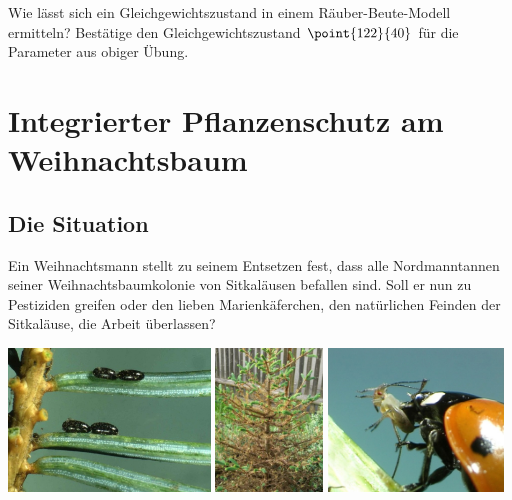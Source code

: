 \documentclass[%
11pt,%
twoside,%
titlepage,%
german,%
headsepline%
]{scrartcl}
\begin{document}
\begin{ueb}
Wie lässt sich ein Gleichgewichtszustand in einem Räuber-Beute-Modell ermitteln? Bestätige den Gleichgewichtszustand $\point{122}{40}$ für die Parameter aus obiger Übung.
\end{ueb}

\clearpage




\clearpage

\section{Integrierter Pflanzenschutz am Weihnachtsbaum}
\subsection{Die Situation}
Ein Weihnachtsmann stellt zu seinem Entsetzen fest, dass alle Nordmanntannen seiner Weihnachtsbaumkolonie von Sitkaläusen befallen sind. Soll er nun zu Pestiziden greifen oder den lieben Marienkäferchen, den natürlichen Feinden der Sitkaläuse, die Arbeit überlassen?
\\[2ex]

\begin{center}
\includegraphics[height=3.8cm]{pictures/sitkalauseier.jpg}
\includegraphics[height=3.8cm]{pictures/tannenbaum.jpg}
\includegraphics[height=3.8cm]{pictures/marienkaefer.jpg}
\end{center}
\end{document}
